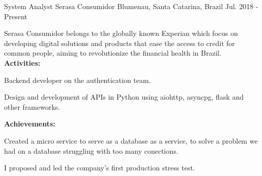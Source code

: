 


\begin{cventries}


\cventry
{System Analyst} %
{Serasa Consumidor} %
{Blumenau, Santa Catarina, Brazil} %
{Jul. 2018 - Present} %
{ %
Serasa Consumidor belongs to the globally known Experian which focus on developing digital solutions and products that ease the access to credit for common people, aiming to revolutionize the financial health in Brazil. \vspace{1.5mm} \hfill \break
\textbf{Activities:} \hfill \break
\begin{cvitems}
\item {Backend developer on the authentication team.}
\item {Design and development of APIs in Python using aiohttp, asyncpg, flask and other frameworks.}
\end{cvitems} \vspace{1.5mm} \hfill \break
\textbf{Achievements:} \hfill \break
\begin{cvitems}
\item {Created a micro service to serve as a database as a service, to solve a problem we had on a database struggling with too many conections.}
\item {I proposed and led the company's first production stress test.}
\end{cvitems}
}



\end{cventries}
